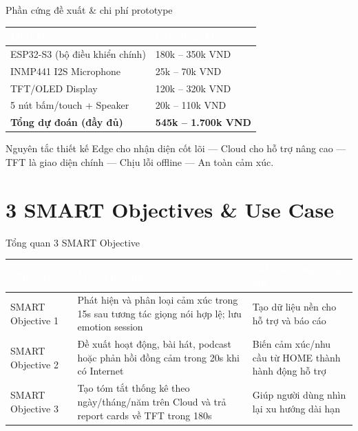 \documentclass[12pt,aspectratio=169]{beamer}
\begin{document}
\begin{frame}{Phần cứng đề xuất \& chi phí prototype}
  \small
  \begin{tabularx}{\textwidth}{Y L{3.5cm}}
  \toprule
  \textcolor{white}{\textbf{Linh kiện}} & \textcolor{white}{\textbf{Giá tham khảo}} \\
  \midrule
  ESP32-S3 (bộ điều khiển chính) & 180k -- 350k VND \\
  INMP441 I2S Microphone & 25k -- 70k VND \\
  TFT/OLED Display & 120k -- 320k VND \\
  5 nút bấm/touch + Speaker & 20k -- 110k VND \\
  \textbf{Tổng dự đoán (đầy đủ)} & \textbf{545k -- 1.700k VND} \\
  \bottomrule
  \end{tabularx}
  \vspace{0.2cm}
  \begin{block}{Nguyên tắc thiết kế}
    Edge cho nhận diện cốt lõi --- Cloud cho hỗ trợ nâng cao --- TFT là giao diện chính --- Chịu lỗi offline --- An toàn cảm xúc.
  \end{block}
\end{frame}

\section{3 SMART Objectives \& Use Case}

\begin{frame}{Tổng quan 3 SMART Objective}
  \small
  \begin{tabularx}{\textwidth}{L{2.8cm}Y L{3.2cm}}
  \toprule
  \textcolor{white}{\textbf{Objective}} & \textcolor{white}{\textbf{Mô tả đầy đủ}} & \textcolor{white}{\textbf{Vai trò trong vòng lặp}} \\
  \midrule
  SMART Objective 1 & Phát hiện và phân loại cảm xúc trong 15s sau tương tác giọng nói hợp lệ; lưu emotion session & Tạo dữ liệu nền cho hỗ trợ và báo cáo \\
  SMART Objective 2 & Đề xuất hoạt động, bài hát, podcast hoặc phản hồi đồng cảm trong 20s khi có Internet & Biến cảm xúc/nhu cầu từ HOME thành hành động hỗ trợ \\
  SMART Objective 3 & Tạo tóm tắt thống kê theo ngày/tháng/năm trên Cloud và trả report cards về TFT trong 180s & Giúp người dùng nhìn lại xu hướng dài hạn \\
  \bottomrule
  \end{tabularx}
\end{frame}
\end{document}
